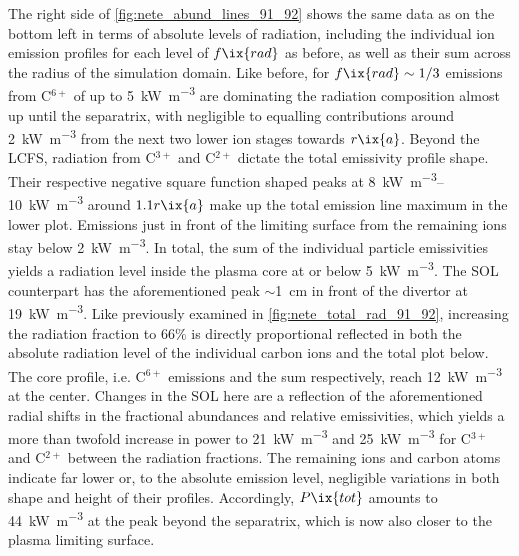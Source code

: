         The right side of \cref{fig:nete_abund_lines_91_92} shows the same data as on the bottom left in terms of absolute levels of radiation, including the individual ion emission profiles for each level of $f\ix{rad}$ as before, as well as their sum across the radius of the simulation domain. Like before, for $f\ix{rad}\sim1/3$ emissions from C$^{6+}$ of up to \SI{5}{\kilo\watt\per\cubic\meter} are dominating the radiation composition almost up until the separatrix, with negligible to equalling contributions around \SI{2}{\kilo\watt\per\cubic\meter} from the next two lower ion stages towards $r\ix{a}$. Beyond the LCFS, radiation from C$^{3+}$ and C$^{2+}$ dictate the total emissivity profile shape. Their respective negative square function shaped peaks at \SIrange{8}{10}{\kilo\watt\per\cubic\meter} around $1.1r\ix{a}$ make up the total emission line maximum in the lower plot. Emissions just in front of the limiting surface from the remaining ions stay below \SI{2}{\kilo\watt\per\cubic\meter}. In total, the sum of the individual particle emissivities yields a radiation level inside the plasma core at or below \SI{5}{\kilo\watt\per\cubic\meter}. The SOL counterpart has the aforementioned peak $\sim$\SI{1}{\centi\meter} in front of the divertor at \SI{19}{\kilo\watt\per\cubic\meter}. Like previously examined in \cref{fig:nete_total_rad_91_92}, increasing the radiation fraction to $66\%$ is directly proportional reflected in both the absolute radiation level of the individual carbon ions and the total plot below. The core profile, i.e. C$^{6+}$ emissions and the sum respectively, reach \SI{12}{\kilo\watt\per\cubic\meter} at the center. Changes in the SOL here are a reflection of the aforementioned radial shifts in the fractional abundances and relative emissivities, which yields a more than twofold increase in power to \SI{21}{\kilo\watt\per\cubic\meter} and \SI{25}{\kilo\watt\per\cubic\meter} for C$^{3+}$ and C$^{2+}$ between the radiation fractions. The remaining ions and carbon atoms indicate far lower or, to the absolute emission level, negligible variations in both shape and height of their profiles. Accordingly, $P\ix{tot}$ amounts to \SI{44}{\kilo\watt\per\cubic\meter} at the peak beyond the separatrix, which is now also closer to the plasma limiting surface.\\%
%
